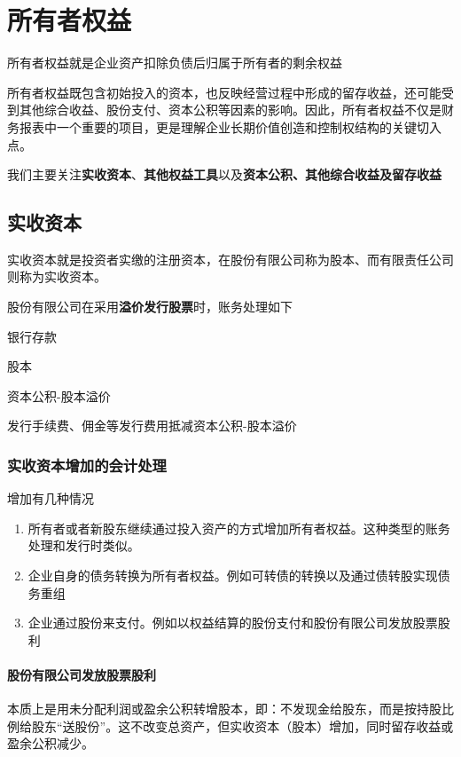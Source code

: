 \documentclass[UTF8,12pt]{ctexart}
\newenvironment{Dr}{%
	\begin{list}{}%
		{
			\setlength{\leftmargin}{2em}
			\setlength{\labelwidth}{2em}
			\setlength{\labelsep}{0pt}
			\setlength{\itemindent}{0pt}
			\setlength{\listparindent}{0pt}
			\setlength{\parsep}{0pt}
			\setlength{\topsep}{0pt}
		}
		\item[\textbf{借：}]
	}{%
	\end{list}
}
\newenvironment{Cr}{%
	\begin{list}{}%
		{
			\setlength{\leftmargin}{3em}
			\setlength{\labelwidth}{2em}
			\setlength{\labelsep}{0pt}
			\setlength{\itemindent}{0pt}
			\setlength{\listparindent}{0pt}
			\setlength{\parsep}{0pt}
			\setlength{\topsep}{0pt}
		}
		\item[\textbf{贷：}]
	}{%
	\end{list}
}
\numberwithin{equation}{section} %
\numberwithin{figure}{section}
\numberwithin{table}{section}
\begin{document}
	
	\newpage
	\section{所有者权益}
	所有者权益就是企业资产扣除负债后归属于所有者的剩余权益
	
	所有者权益既包含初始投入的资本，也反映经营过程中形成的留存收益，还可能受到其他综合收益、股份支付、资本公积等因素的影响。因此，所有者权益不仅是财务报表中一个重要的项目，更是理解企业长期价值创造和控制权结构的关键切入点。
	
	我们主要关注\textbf{实收资本}、\textbf{其他权益工具}以及\textbf{资本公积、其他综合收益及留存收益}
	
	\subsection{实收资本}
	实收资本就是投资者实缴的注册资本，在股份有限公司称为股本、而有限责任公司则称为实收资本。
	
	股份有限公司在采用\textbf{溢价发行股票}时，账务处理如下
	
	\begin{Dr}
		银行存款
	\end{Dr}
	\begin{Cr}
		股本
		
		资本公积-股本溢价
	\end{Cr}
	发行手续费、佣金等发行费用抵减资本公积-股本溢价
	
	\subsubsection{实收资本增加的会计处理}
	
	增加有几种情况
	\begin{enumerate}
		\item 所有者或者新股东继续通过投入资产的方式增加所有者权益。这种类型的账务处理和发行时类似。
		
		\item 企业自身的债务转换为所有者权益。例如可转债的转换以及通过债转股实现债务重组
		
		\item 企业通过股份来支付。例如以权益结算的股份支付和股份有限公司发放股票股利
	\end{enumerate}

	\paragraph{股份有限公司发放股票股利}
	本质上是用未分配利润或盈余公积转增股本，即：不发现金给股东，而是按持股比例给股东“送股份”。这不改变总资产，但实收资本（股本）增加，同时留存收益或盈余公积减少。
	
\end{document}
